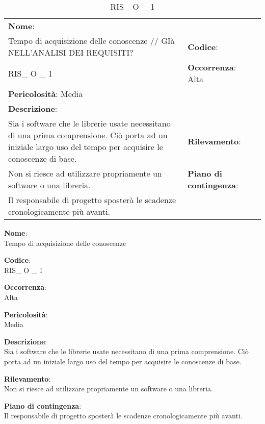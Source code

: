 \renewcommand{\arraystretch}{1.5}
\begin{longtable} { 
		>{\raggedright}p{} 
		>{\raggedright}p{} 
		>{\raggedright}p{}    }
	
	\caption{RIS\_ O \_ 1 } \endhead	
	
	
	\textbf{Nome}: \\ Tempo di acquisizione delle conoscenze // GIà NELL'ANALISI DEI REQUISITI?
	& \textbf{Codice}: \\ RIS\_ O \_ 1 
	& \textbf{Occorrenza}: Alta \\ \textbf{Pericolosità}: Media
	
	\tabularnewline
	
	\textbf{Descrizione}: \\ Sia i software che le librerie usate necessitano di una prima comprensione. Ciò porta ad un iniziale largo uso del tempo per acquisire le conoscenze di base.
	& 
	\textbf{Rilevamento}: \\ Non si riesce ad utilizzare propriamente un software o una libreria.
	
	&  
	\textbf{Piano di contingenza}: \\  Il responsabile di progetto sposterà le scadenze cronologicamente più avanti.
	
\end{longtable}


{\setlength{\parindent}{0cm}
\begin{minipage}{\textwidth} 
\begin{multicols}{4}
\textbf{Nome}: \\ Tempo di acquisizione delle conoscenze
\columnbreak

\textbf{Codice}: \\ RIS\_ O \_ 1 
\columnbreak

\textbf{Occorrenza}: \\ Alta 
\columnbreak

\textbf{Pericolosità}: \\ Media

\end{multicols}

\begin{multicols}{3}

\textbf{Descrizione}: \\ Sia i software che le librerie usate necessitano di una prima comprensione. Ciò porta ad un iniziale largo uso del tempo per acquisire le conoscenze di base.
\columnbreak

\textbf{Rilevamento}: \\ Non si riesce ad utilizzare propriamente un software o una libreria.
\columnbreak

\textbf{Piano di contingenza}: \\ Il responsabile di progetto sposterà le scadenze cronologicamente più avanti. \\

\columnbreak
\end{multicols}
\end{minipage}} \\

